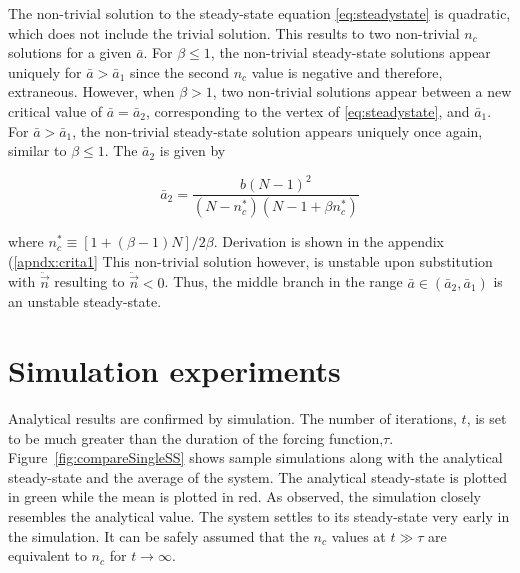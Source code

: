 The non-trivial solution to the steady-state equation \eqref{eq:steadystate} is quadratic, which does not include the trivial solution.
This results to two non-trivial $n_{c}$ solutions for a given $\bar{a}$.
For $\beta\leq1$, the non-trivial steady-state solutions appear uniquely for $\bar{a}>\bar{a}_{1}$ since the second $n_{c}$ value is negative and therefore, extraneous.
However, when $\beta>1$, two non-trivial solutions appear between a new critical value of $\bar{a}=\bar{a}_{2}$, corresponding to the vertex of \eqref{eq:steadystate}, and $\bar{a}_{1}$.
For $\bar{a}>\bar{a}_{1}$, the non-trivial steady-state solution appears uniquely once again, similar to $\beta\leq1$.
The $\bar{a}_{2}$ is given by

\begin{equation}
\bar{a}_{2} = \frac{b(N-1)^{2}}{(N-n_{c}^{*})(N-1+\beta n_{c}^{*})}
\end{equation}

where $n_{c}^{*} \equiv [1+(\beta-1)N]/2\beta$.
Derivation is shown in the appendix (\ref{apndx:crita1}
This non-trivial solution however, is unstable upon substitution with $\ddot{\vec{n}}$ resulting to $\ddot{\vec{n}}<0$.
Thus, the middle branch in the range $\bar{a}\in(\bar{a}_{2},\bar{a}_{1})$ is an unstable steady-state.
 
\section{Simulation experiments}
\hspace{\parindent} Analytical results are confirmed by simulation. The number of iterations, $t$, is set to be much greater than the duration of the forcing function,$\tau$.
Figure~\ref{fig:compareSingleSS} shows sample simulations along with the analytical steady-state and the average of the system.
The analytical steady-state is plotted in green while the mean is plotted in red.
As observed, the simulation closely resembles the analytical value. The system settles to its steady-state very early in the simulation.
It can be safely assumed that the $n_{c}$ values at $t \gg \tau$ are equivalent to $n_{c}$ for $t \rightarrow \infty$.

